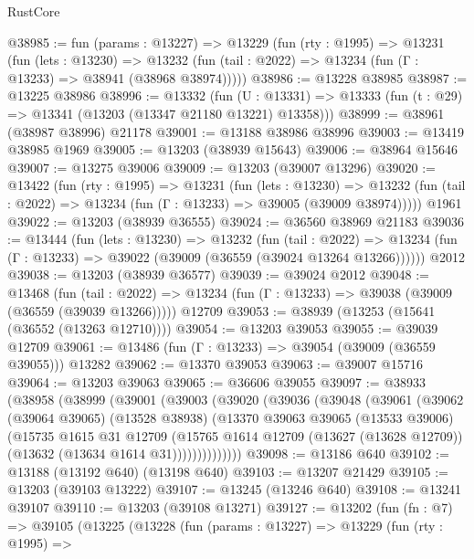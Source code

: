 \begin{lexlean}{RustCore}
\begin{coremodule}
@38985 := fun (params : @13227) =>
  @13229
    (fun (rty : @1995) =>
    @13231
      (fun (lets : @13230) =>
      @13232 (fun (tail : @2022) => @13234 (fun (Γ : @13233) => @38941 (@38968 @38974)))))
@38986 := @13228 @38985
@38987 := @13225 @38986
@38996 := @13332
    (fun (U : @13331) => @13333 (fun (t : @29) => @13341 (@13203 (@13347 @21180 @13221) @13358)))
@38999 := @38961 (@38987 @38996) @21178
@39001 := @13188 @38986 @38996
@39003 := @13419 @38985 @1969
@39005 := @13203 (@38939 @15643)
@39006 := @38964 @15646
@39007 := @13275 @39006
@39009 := @13203 (@39007 @13296)
@39020 := @13422
    (fun (rty : @1995) =>
    @13231
      (fun (lets : @13230) =>
      @13232 (fun (tail : @2022) => @13234 (fun (Γ : @13233) => @39005 (@39009 @38974)))))
    @1961
@39022 := @13203 (@38939 @36555)
@39024 := @36560 @38969 @21183
@39036 := @13444
    (fun (lets : @13230) =>
    @13232
      (fun (tail : @2022) =>
      @13234 (fun (Γ : @13233) => @39022 (@39009 (@36559 (@39024 @13264 @13266))))))
    @2012
@39038 := @13203 (@38939 @36577)
@39039 := @39024 @2012
@39048 := @13468
    (fun (tail : @2022) => @13234 (fun (Γ : @13233) => @39038 (@39009 (@36559 (@39039 @13266)))))
    @12709
@39053 := @38939 (@13253 (@15641 (@36552 (@13263 @12710))))
@39054 := @13203 @39053
@39055 := @39039 @12709
@39061 := @13486 (fun (Γ : @13233) => @39054 (@39009 (@36559 @39055))) @13282
@39062 := @13370 @39053
@39063 := @39007 @15716
@39064 := @13203 @39063
@39065 := @36606 @39055
@39097 := @38933
    (@38958
      (@38999
        (@39001
          (@39003
            (@39020
              (@39036
                (@39048
                  (@39061
                    (@39062
                      (@39064 @39065)
                      (@13528 @38938)
                      (@13370
                        @39063
                        @39065
                        (@13533 @39006)
                        (@15735
                          @1615
                          @31
                          @12709
                          (@15765
                            @1614
                            @12709
                            (@13627 (@13628 @12709))
                            (@13632 (@13634 @1614 @31))))))))))))))
@39098 := @13186 @640
@39102 := @13188 (@13192 @640) (@13198 @640)
@39103 := @13207 @21429
@39105 := @13203 (@39103 @13222)
@39107 := @13245 (@13246 @640)
@39108 := @13241 @39107
@39110 := @13203 (@39108 @13271)
@39127 := @13202
    (fun (fn : @7) =>
    @39105
      (@13225
        (@13228
          (fun (params : @13227) =>
          @13229
            (fun (rty : @1995) =>

\end{coremodule}
\end{lexlean}
